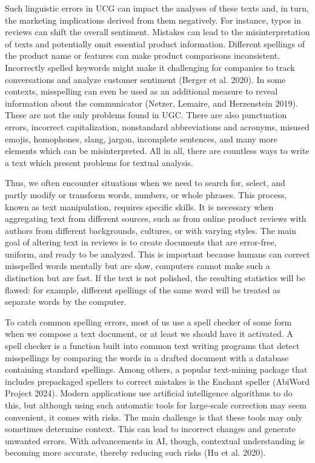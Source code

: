 Such linguistic errors in UCG can impact the analyses of
these texts and, in turn, the marketing implications derived from them negatively.
For instance, typos in reviews can shift the overall sentiment. Mistakes
can lead to the misinterpretation of texts and potentially omit essential
product information. Different spellings of the product name or features
can make product comparisons inconsistent. Incorrectly spelled keywords
might make it challenging for companies to track conversations and
analyze customer sentiment (Berger et al. 2020). In some contexts,
misspelling can even be used as an additional measure
to reveal information about the communicator (Netzer, Lemaire, and
Herzenstein 2019). These are not the only problems found in UGC.
There are also punctuation errors, incorrect capitalization, nonstandard
abbreviations and acronyms, misused emojis, homophones, slang, jargon,
incomplete sentences, and many more elements which can be misinterpreted. All in all, there are countless ways to write a text which present problems for textual analysis.

Thus, we often encounter situations when we need to search for, select,
and partly modify or transform words, numbers, or whole phrases. This
process, known as text manipulation, requires specific skills. It is
necessary when aggregating text from different sources, such as from
online product reviews with authors from different backgrounds,
cultures, or with varying styles. The main goal of altering text in reviews is
to create documents that are error-free, uniform, and ready to be
analyzed. This is important because humans can correct
misspelled words mentally but are slow, computers cannot make such a distinction
but are fast. If the text is not polished, the resulting statistics will
be flawed: for example, different spellings of the same word will be
treated as separate words by the computer.

To catch common spelling errors, most of us use a spell
checker of some form when we compose a text document, or at least we
should have it activated. A spell checker is a function built into
common text writing programs that detect misspellings by comparing the
words in a drafted document with a database containing standard
spellings. Among others, a popular text-mining package that includes
prepackaged spellers to correct mistakes is the Enchant speller
(AbiWord Project 2024). Modern applications use artificial intelligence
algorithms to do this, but although using such automatic tools for large-scale
correction may seem convenient, it comes with risks. The main
challenge is that these tools may only sometimes determine context. This
can lead to incorrect changes and generate unwanted errors. With
advancements in AI, though, contextual understanding is becoming more accurate, thereby reducing such risks (Hu et al. 2020).

